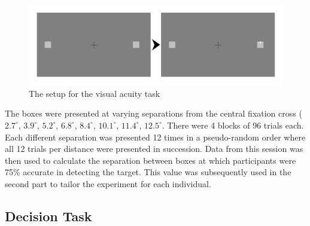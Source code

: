 \documentclass[vision,article,submit,moreauthors,pdftex,10pt,a4paper]{mdpi}
\begin{document}
\begin{figure}[H]
	\centering
	\includegraphics[scale=.6]{../Figures/Part_1_timeline.png}
	\caption{The setup for the visual acuity task}
	\label{fig:Part1}
\end{figure} 

The boxes were presented at varying separations from the central fixation cross ($2.7^{\circ}$, $3.9^{\circ}$, $5.2^{\circ}$, $6.8^{\circ}$, $8.4^{\circ}$, $10.1^{\circ}$, $11.4^{\circ}$, $12.5^{\circ}$. There were 4 blocks of 96 trials each. Each different separation was presented 12 times in a pseudo-random order where all 12 trials per distance were presented in succession. Data from this session was then used to calculate the separation between boxes at which participants were 75\% accurate in detecting the target. This value was subsequently used in the second part to tailor the experiment for each individual.

\subsection{Decision Task}
\end{document}
